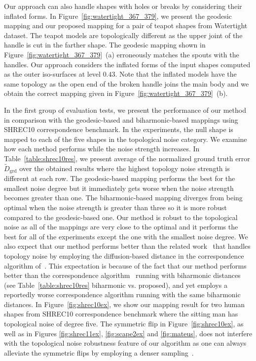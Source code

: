 Our approach can also handle shapes with holes or breaks by considering their inflated forms. In Figure~\ref{fig:watertight_367_379}, we present the geodesic mapping and our proposed mapping for a pair of teapot shapes from Watertight dataset. The teapot models are topologically different as the upper joint of the handle is cut in the farther shape. The geodesic mapping shown in Figure~\ref{fig:watertight_367_379}~(a) erroneously matches the spouts with the handles. Our approach considers the inflated forms of the input shapes computed as the outer iso-surfaces at level $0.43$. Note that the inflated models have the same topology as the open end of the broken handle joins the main body and we obtain the correct mapping given in Figure~\ref{fig:watertight_367_379}~(b).

In the first group of evaluation tests, we present the performance of our method in comparison with the geodesic-based and biharmonic-based mappings using SHREC10 correspondence benchmark. In the experiments, the null shape is mapped to each of the five shapes in the topological noise category. We examine how each method performs while the noise strength increases. In Table~\ref{table:shrec10res}, we present average of the normalized ground truth error ${\widetilde{D}_{\mathrm{grd}}}$ over the obtained results where the highest topology noise strength is different at each row. The geodesic-based mapping performs the best for the smallest noise degree but it immediately gets worse when the noise strength becomes greater than one. The biharmonic-based mapping diverges from being optimal when the noise strength is greater than three so it is more robust compared to the geodesic-based one. Our method is robust to the topological noise as all of the mappings are very close to the optimal and it performs the best for all of the experiments except the one with the smallest noise degree. We also expect that our method performs better than the related work~\cite{Bronstein10} that handles topology noise by employing the diffusion-based distance in the correspondence algorithm of~\cite{bronstein2006generalized}. This expectation is because of the fact that our method performs better than the correspondence algorithm~\cite{ys2012EM} running with biharmonic distances (see Table~\ref{table:shrec10res} biharmonic vs. proposed), and yet \cite{Bronstein10} employs a reportedly worse correspondence algorithm \cite{bronstein2006generalized} running with the same biharmonic distances. In Figure~\ref{fig:shrec10ex}, we show our mapping result for two human shapes from SHREC10 correspondence benchmark where the sitting man has topological noise of degree five. {The symmetric flip in Figure~\ref{fig:shrec10ex}, as well as in Figures \ref{fig:shrec11ex}, \ref{fig:scape2ex} and \ref{fig:mateus}, does not interfere with the topological noise robustness feature of our algorithm as one can always alleviate the symmetric flips by employing a denser sampling~\cite{Sahillioglu12b}.}
